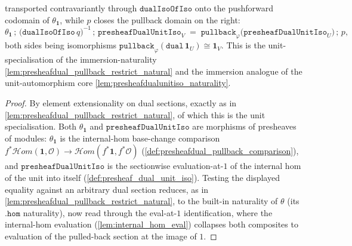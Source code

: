 \begin{lemma}
  transported contravariantly through \(\mathtt{dualIsoOfIso}\) onto the pushforward codomain of
  \(\theta_{\mathbf 1}\), while \(p\) closes the pullback domain on the right:
  \[
    \theta_{\mathbf 1}
      \,\mathbin{;}\, \bigl(\mathtt{dualIsoOfIso}\,q\bigr)^{-1}
      \,\mathbin{;}\, \mathtt{presheafDualUnitIso}_V
    \;=\; \mathtt{pullback}_\varphi\bigl(\mathtt{presheafDualUnitIso}_U\bigr)
      \,\mathbin{;}\, p,
  \]
  both sides being isomorphisms
  \(\mathtt{pullback}_\varphi(\mathtt{dual}\,\mathbf 1_U) \cong \mathbf 1_V\). This is the
  unit-specialisation of the immersion-naturality \cref{lem:presheafdual_pullback_restrict_natural}
  and the immersion analogue of the unit-automorphism core
  \cref{lem:presheafdualunitiso_naturality}.
\end{lemma}
\begin{proof}
  \leanok
  By element extensionality on dual sections, exactly as in
  \cref{lem:presheafdual_pullback_restrict_natural}, of which this is the unit specialisation. Both
  \(\theta_{\mathbf 1}\) and \(\mathtt{presheafDualUnitIso}\) are morphisms of presheaves of modules:
  \(\theta_{\mathbf 1}\) is the internal-hom base-change comparison
  \(f^{*}\mathcal{H}om(\mathbf 1, \mathcal{O}) \to \mathcal{H}om(f^{*}\mathbf 1, f^{*}\mathcal{O})\)
  (\cref{def:presheafdual_pullback_comparison}), and \(\mathtt{presheafDualUnitIso}\) is the
  sectionwise evaluation-at-\(1\) of the internal hom of the unit into itself
  (\cref{def:presheaf_dual_unit_iso}). Testing the displayed equality against an arbitrary dual
  section reduces, as in \cref{lem:presheafdual_pullback_restrict_natural}, to the built-in
  naturality of \(\theta\) (its \(\mathtt{.hom}\) naturality), now read through the eval-at-\(1\)
  identification, where the internal-hom evaluation (\cref{lem:internal_hom_eval}) collapses both
  composites to evaluation of the pulled-back section at the image of \(1\).


\end{proof}
